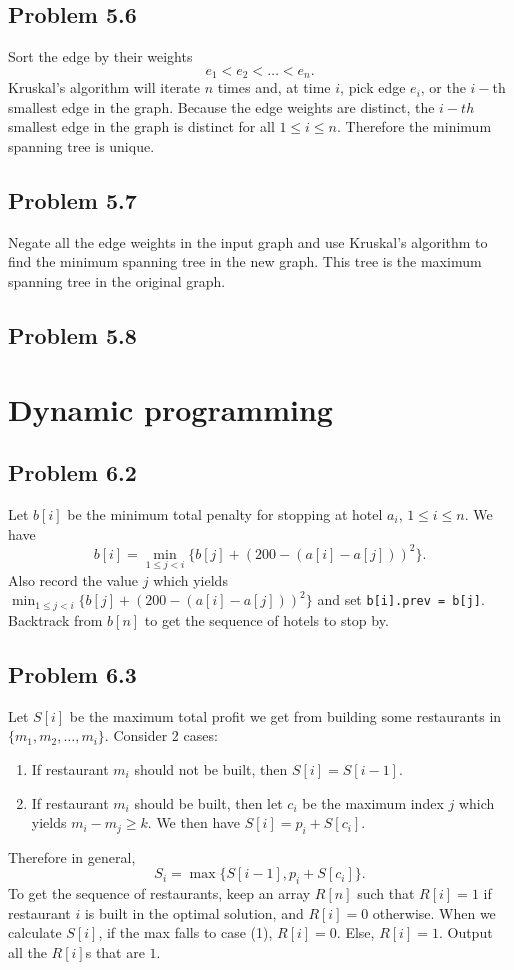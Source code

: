 \documentclass[12pt]{report}
\newcommand{\co}{\texttt}
\begin{document}
\section{Problem 5.6}
Sort the edge by their weights $$e_1 < e_2 < \ldots < e_n.$$
Kruskal's algorithm will iterate $n$ times and, at time $i$, pick edge $e_i$, or the $i-$th smallest edge in the graph. Because the edge weights are distinct, the $i-th$ smallest edge in the graph is distinct for all $1 \le i \le n$. Therefore the minimum spanning tree is unique.

\section{Problem 5.7}
Negate all the edge weights in the input graph and use Kruskal's algorithm to find the minimum spanning tree in the new graph. This tree is the maximum spanning tree in the original graph.

\section{Problem 5.8}


\chapter[Chapter 6 Solution]{Dynamic programming}
\section{Problem 6.2}
Let $b[i]$ be the minimum total penalty for stopping at hotel $a_i$, $1 \le i \le n$. We have $$b[i] = \min_{1 \le j < i} \{ b[j] + (200 - (a[i] - a[j]))^2\}.$$
Also record the value $j$ which yields $\displaystyle \min_{1 \le j < i} \{ b[j] + (200 - (a[i] - a[j]))^2\}$ and set \co{b[i].prev = b[j]}. Backtrack from $b[n]$ to get the sequence of hotels to stop by.

\section{Problem 6.3}
Let $S[i]$ be the maximum total profit we get from building some restaurants in $\{m_1, m_2, \ldots, m_i\}$. Consider 2 cases:
\begin{enumerate}[(1)]
  \item If restaurant $m_i$ should not be built, then $S[i] = S[i-1]$.
  \item If restaurant $m_i$ should be built, then let $c_i$ be the maximum index $j$ which yields $m_i - m_j \ge k$. We then have $\displaystyle S[i] = p_i + S[c_i]$.
\end{enumerate}
Therefore in general, $$S_i = \max \{ S[i-1], p_i + S[c_i]\}.$$
To get the sequence of restaurants, keep an array $R[n]$ such that $R[i] = 1$ if restaurant $i$ is built in the optimal solution, and $R[i] = 0$ otherwise. When we calculate $S[i]$, if the max falls to case (1), $R[i] = 0$. Else, $R[i] = 1$. Output all the $R[i]$s that are $1$.
\end{document}

